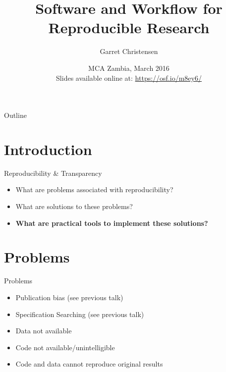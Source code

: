 \documentclass{beamer}
\title[Software and Workflow] %
{Software and Workflow for Reproducible Research}
\author[Christensen] %
{Garret Christensen\inst{1}}
\institute[UC Berkeley, Berkeley Initiatiative for Transparency in the Social Sciences] %
{
  \inst{1}%
  UC Berkeley:\\
  Berkeley Initiative for Transparency in the Social Sciences\\
  Berkeley Institute for Data Science\\
  }
\date[BITSS2014] %
{MCA Zambia, March 2016\\
Slides available online at: \url{https://osf.io/m8ey6/}}
\begin{document}


\begin{frame}
  \titlepage
\end{frame}

\begin{frame}{Outline}
  \tableofcontents
\end{frame}

\section{Introduction}

\begin{frame}{Reproducibility \& Transparency}
\begin{itemize}
\item What are problems associated with reproducibility?
\item What are solutions to these problems?
\item \textbf{What are practical tools to implement these solutions?}
\end{itemize}
\end{frame}
\section{Problems}
\begin{frame}{Problems}
 \begin{itemize}
 \item Publication bias (see previous talk)
 \item Specification Searching (see previous talk)
 \item Data not available
 \item Code not available/unintelligible
 \item Code and data cannot reproduce original results
 \end{itemize}
\end{frame}
\end{document}
